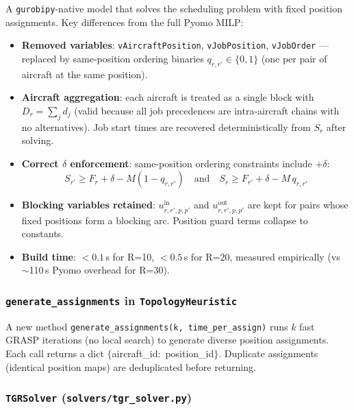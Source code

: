 A \texttt{gurobipy}-native model that solves the scheduling problem with fixed
position assignments.  Key differences from the full Pyomo MILP:

\begin{itemize}[noitemsep]
    \item \textbf{Removed variables}: \texttt{vAircraftPosition}, \texttt{vJobPosition},
          \texttt{vJobOrder} — replaced by same-position ordering binaries
          $q_{r,r'} \in \{0,1\}$ (one per pair of aircraft at the same position).
    \item \textbf{Aircraft aggregation}: each aircraft is treated as a single block
          with $D_r = \sum_j d_j$ (valid because all job precedences are intra-aircraft
          chains with no alternatives).  Job start times are recovered
          deterministically from $S_r$ after solving.
    \item \textbf{Correct $\delta$ enforcement}: same-position ordering constraints
          include $+\delta$:
          \[
              S_{r'} \geq F_r + \delta - M(1 - q_{r,r'})
              \quad\text{and}\quad
              S_r    \geq F_{r'} + \delta - M\, q_{r,r'}
          \]
    \item \textbf{Blocking variables retained}: $u^{\mathrm{in}}_{r,r',p,p'}$ and
          $u^{\mathrm{out}}_{r,r',p,p'}$ are kept for pairs whose fixed positions
          form a blocking arc.  Position guard terms collapse to constants.
    \item \textbf{Build time}: $<0.1$\,s for R=10, $<0.5$\,s for R=20, measured
          empirically (vs $\sim$110\,s Pyomo overhead for R=30).
\end{itemize}

\subsubsection{\texttt{generate\_assignments} in \texttt{TopologyHeuristic}}

A new method \texttt{generate\_assignments(k, time\_per\_assign)} runs $k$ fast
GRASP iterations (no local search) to generate diverse position assignments.
Each call returns a dict $\{$aircraft\_id$:$ position\_id$\}$.  Duplicate
assignments (identical position maps) are deduplicated before returning.

\subsubsection{\texttt{TGRSolver} (\texttt{solvers/tgr\_solver.py})}


